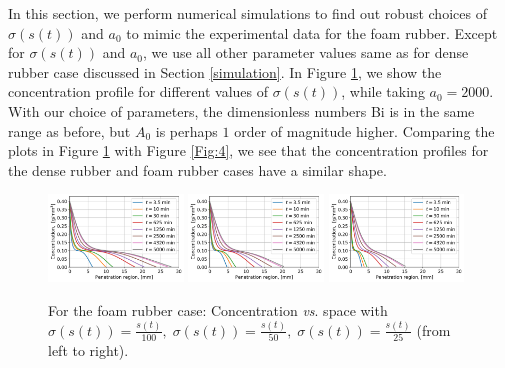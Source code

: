 \documentclass{article}
\begin{document}
In this section, we perform numerical simulations to find out robust choices of  $\sigma(s(t))$ and $a_0$ to mimic the experimental data for the  foam rubber. Except for $\sigma(s(t))$ and $a_0$, we use  all other parameter values same as for dense rubber case discussed in Section \ref{simulation}. 
 In Figure \ref{Fig:17}, we show  the concentration profile for different values of $\sigma(s(t))$, while taking $a_0 = 2000$. With our choice of parameters, the dimensionless numbers Bi is in the same range as before, but $A_0$ is perhaps $1$ order of magnitude higher.
Comparing the plots in Figure \ref{Fig:17} with Figure \ref{Fig:4}, we see that the concentration profiles for the dense rubber and  foam rubber  cases have a similar shape.
\begin{figure}[h!]
	\centering
	\includegraphics[width=0.32\textwidth]{Foam_Large_Con_Sigma_001.png}
	\hspace{0.1cm}
	\includegraphics[width=0.32\textwidth]{Foam_Large_Con_Sigma_002.png}
	\hspace{0.1cm}
	\includegraphics[width=0.32\textwidth]{Foam_Large_Con_Sigma_004.png}
	\caption{For the foam rubber case: Concentration \textit{vs}. space with $\sigma(s(t)) =  \frac{s(t)}{100},\; \sigma(s(t)) = \frac{s(t)}{50}, \;\sigma(s(t)) = \frac{s(t)}{25}$ (from left to right).}
	\label{Fig:17}
\end{figure}

\end{document}

